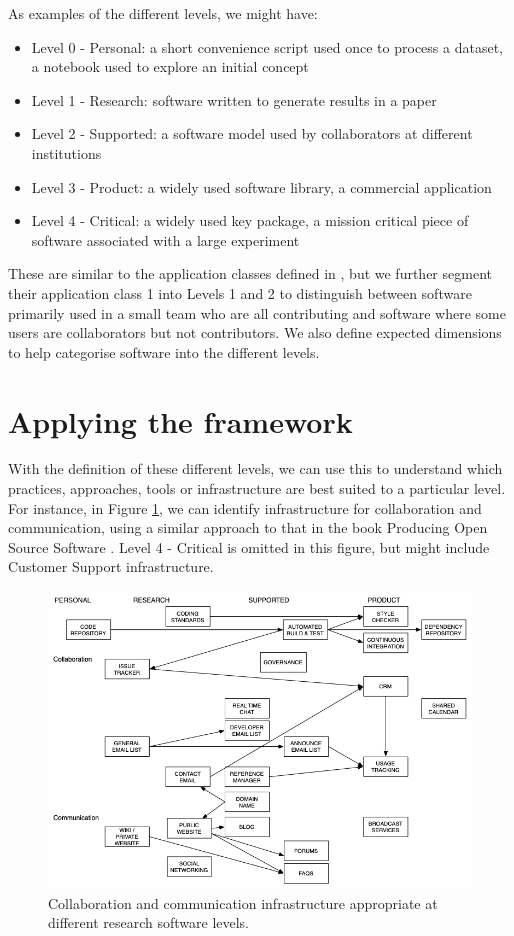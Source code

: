 \documentclass[conference]{IEEEtran}
\begin{document}
As examples of the different levels, we might have:
\begin{itemize}
    \item Level 0 - Personal: a short convenience script used once to process a dataset, a notebook used to explore an initial concept
    \item Level 1 - Research: software written to generate results in a paper
    \item Level 2 - Supported: a software model used by collaborators at different institutions
    \item Level 3 - Product: a widely used software library, a commercial application
    \item Level 4 - Critical: a widely used key package, a mission critical piece of software associated with a large experiment
\end{itemize}

These are similar to the application classes defined in \cite{Schlauch}, but we further segment their application class 1 into Levels 1 and 2 to distinguish between software primarily used in a small team who are all contributing and software where some users are collaborators but not contributors. We also define expected dimensions to help categorise software into the different levels.


\section{Applying the framework}
With the definition of these different levels, we can use this to understand which practices, approaches, tools or infrastructure are best suited to a particular level. For instance, in Figure \ref{infrastructure}, we can identify infrastructure for collaboration and communication, using a similar approach to that in the book Producing Open Source Software \cite{Fogel}. Level 4 - Critical is omitted in this figure, but might include Customer Support infrastructure.

\begin{figure}[htbp]
\centerline{\includegraphics[width=\textwidth]{infrastructure.png}}
\caption{Collaboration and communication infrastructure appropriate at different research software levels.}
\label{infrastructure}
\end{figure}
\end{document}
